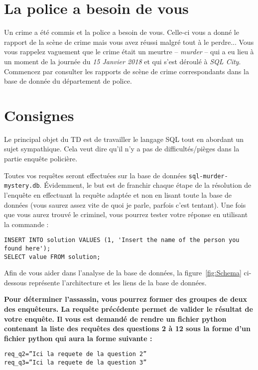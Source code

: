 


\section{La police a besoin de vous}

Un crime a été commis et la police a besoin de vous. Celle-ci vous a donné le rapport de la scène 
de crime mais vous avez réussi malgré tout à le perdre... Vous vous rappelez vaguement que le crime
était un meurtre -- \emph{murder} -- qui a eu lieu à un moment de la journée du \emph{15 Janvier 2018} et qui s'est
déroulé à \emph{SQL City}. Commencez par consulter les rapports de scène de crime correspondants dans
la base de donnée du département de police.

\section{Consignes}

Le principal objet du TD est de travailler le langage SQL tout en abordant un sujet sympathique. Cela veut dire qu'il n'y a pas de difficultés/pièges dans la partie enquête policière. 

Toutes vos requêtes seront effectuées sur la base de données \texttt{sql-murder-mystery.db}. \'Evidemment, le but est
de franchir chaque étape de la résolution de l'enquête en effectuant la requête adaptée et non en lisant toute la
base de données (vous saurez assez vite de quoi je parle, parfois c'est tentant). Une fois que vous aurez trouvé le
criminel, vous pourrez tester votre réponse en utilisant la commande :

\begin{lstlisting}
INSERT INTO solution VALUES (1, 'Insert the name of the person you found here');
SELECT value FROM solution;
\end{lstlisting}


Afin de vous aider dans l'analyse de la base de données, la figure~\ref{fig:Schema} ci-dessous représente l'architecture et les liens de la base de données.


\textbf{Pour déterminer l'assassin, vous pourrez former des groupes de deux des enquêteurs. La requête précédente permet de valider le résultat de votre enquête.
Il vous est demandé de rendre un fichier python contenant la liste des requêtes des questions 2 à 12 sous la forme d'un fichier python qui aura la forme suivante : }

\noindent\texttt{req\_q2=''Ici la requete de la question 2''} \\
\texttt{req\_q3=''Ici la requete de la question 3''}

